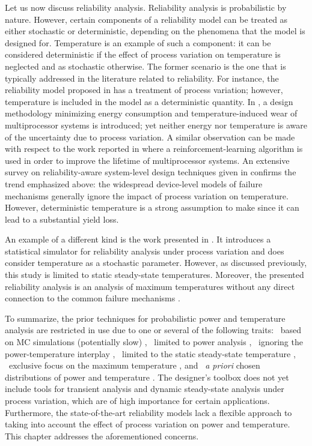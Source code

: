 Let us now discuss reliability analysis. Reliability analysis is probabilistic
by nature. However, certain components of a reliability model can be treated as
either stochastic or deterministic, depending on the phenomena that the model is
designed for. Temperature is an example of such a component: it can be
considered deterministic if the effect of process variation on temperature is
neglected and as stochastic otherwise. The former scenario is the one that is
typically addressed in the literature related to reliability. For instance, the
reliability model proposed in \cite{xiang2010} has a treatment of process
variation; however, temperature is included in the model as a deterministic
quantity. In \cite{das2014a}, a design methodology minimizing energy consumption
and temperature-induced wear of multiprocessor systems is introduced; yet
neither energy nor temperature is aware of the uncertainty due to process
variation. A similar observation can be made with respect to the work reported
in \cite{das2014c} where a reinforcement-learning algorithm is used in order to
improve the lifetime of multiprocessor systems. An extensive survey on
reliability-aware system-level design techniques given in \cite{das2014b}
confirms the trend emphasized above: the widespread device-level models of
failure mechanisms generally ignore the impact of process variation on
temperature. However, deterministic temperature is a strong assumption to make
since it can lead to a substantial yield loss.

An example of a different kind is the work presented in \cite{lee2013}. It
introduces a statistical simulator for reliability analysis under process
variation and does consider temperature as a stochastic parameter. However, as
discussed previously, this study is limited to static steady-state temperatures.
Moreover, the presented reliability analysis is an analysis of maximum
temperatures without any direct connection to the common failure mechanisms
\cite{jedec2016}.

To summarize, the prior techniques for probabilistic power and temperature
analysis are restricted in use due to one or several of the following traits:
\one~based on \ac{MC} simulations (potentially slow) \cite{chandra2010},
\two~limited to power analysis \cite{bhardwaj2006, ghanta2006, vrudhula2006,
bhardwaj2008, shen2009, chandra2010}, \three~ignoring the power-temperature
interplay \cite{bhardwaj2006, ghanta2006, vrudhula2006, bhardwaj2008,
huang2009a, shen2009}, \four~limited to the static steady-state temperature
\cite{huang2009a, juan2011, juan2012, lee2013}, \five~exclusive focus on the
maximum temperature \cite{juan2011}, and \six~\emph{a priori} chosen
distributions of power and temperature \cite{bhardwaj2006, srivastava2010,
juan2012}. The designer's toolbox does not yet include tools for transient
analysis and dynamic steady-state analysis under process variation, which are of
high importance for certain applications. Furthermore, the state-of-the-art
reliability models lack a flexible approach to taking into account the effect of
process variation on power and temperature. This chapter addresses the
aforementioned concerns.
